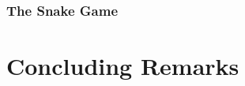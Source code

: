 \documentclass[11pt]{article}
\begin{document}
\subsubsection*{The Snake Game}
\label{sec:org400cfb2}

\section*{Concluding Remarks}
\label{sec:org9e6531d}
\end{document}
